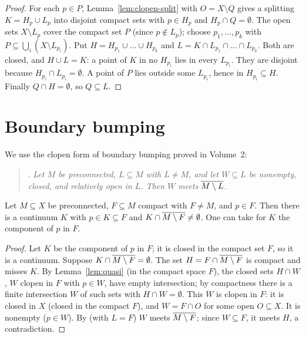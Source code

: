 \begin{proof}
For each $p\in P$, Lemma~\ref{lem:clopen-split} with $O=X\setminus Q$ gives a splitting
$K=H_p\cup L_p$ into disjoint compact sets with $p\in H_p$ and $H_p\cap Q=\emptyset$. The open sets
$X\setminus L_p$ cover the compact set $P$ (since $p\notin L_p$); choose $p_1,\dots,p_k$ with
$P\subseteq\bigcup_i(X\setminus L_{p_i})$. Put $H=H_{p_1}\cup\dots\cup H_{p_k}$ and $L=K\cap
L_{p_1}\cap\dots\cap L_{p_k}$. Both are closed, and $H\cup L=K$: a point of $K$ in no $H_{p_i}$ lies
in every $L_{p_i}$. They are disjoint because $H_{p_i}\cap L_{p_i}=\emptyset$. A point of $P$ lies
outside some $L_{p_i}$, hence in $H_{p_i}\subseteq H$. Finally $Q\cap H=\emptyset$, so $Q\subseteq L$.
\end{proof}


\section{Boundary bumping}

We use the clopen form of boundary bumping proved in Volume~2:

\begin{quote}
. \emph{Let $M$ be preconnected, $L\subseteq M$ with $L\ne M$, and let $W\subseteq L$ be
nonempty, closed, and relatively open in $L$. Then $W$ meets $\overline{M\setminus L}$.}
\end{quote}

\begin{theorem}\label{thm:bump-closed}
Let $M\subseteq X$ be preconnected, $F\subseteq M$ compact with $F\ne M$, and $p\in F$. Then there is a
continuum $K$ with $p\in K\subseteq F$ and $K\cap\overline{M\setminus F}\ne\emptyset$. One can take for
$K$ the component of $p$ in $F$.
\end{theorem}

\begin{proof}
Let $K$ be the component of $p$ in $F$; it is closed in the compact set $F$, so it is a continuum.
Suppose $K\cap\overline{M\setminus F}=\emptyset$. The set $H=F\cap\overline{M\setminus F}$ is compact and misses
$K$. By Lemma~\ref{lem:quasi} (in the compact space $F$), the closed sets $H\cap W$, $W$ clopen in $F$
with $p\in W$, have empty intersection; by compactness there is a finite intersection $W$ of such
sets with $H\cap W=\emptyset$. This $W$ is clopen in $F$: it is closed in $X$ (closed in the compact
$F$), and $W=F\cap O$ for some open $O\subseteq X$. It is nonempty ($p\in W$). By 
(with $L=F$) $W$ meets $\overline{M\setminus F}$; since $W\subseteq F$, it meets $H$, a contradiction.
\end{proof}

